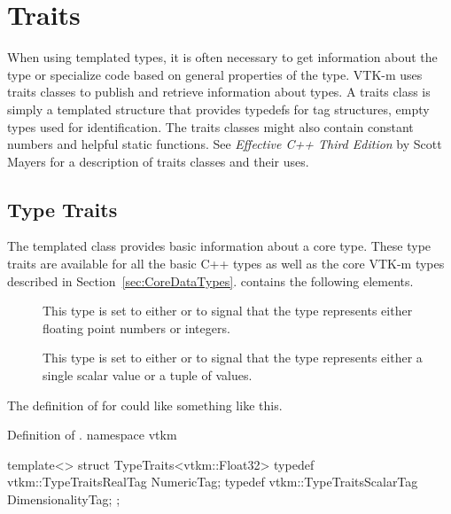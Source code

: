 \section{Traits}
\label{sec:Traits}


When using templated types, it is often necessary to get information about
the type or specialize code based on general properties of the type. VTK-m
uses traits classes to publish and retrieve information about types. A
traits class is simply a templated structure that provides typedefs for
tag structures, empty types used for identification. The traits
classes might also contain constant numbers and helpful static
functions. See {\it Effective C++ Third Edition} by Scott Mayers for a
description of traits classes and their uses.

\subsection{Type Traits}

The  templated class provides basic information
about a core type. These type traits are available for all the basic C++
types as well as the core VTK-m types described in
Section~\ref{sec:CoreDataTypes}.  contains the following
elements.


\begin{description}
\item[]  
  This type is set to either  or
   to signal that the type represents either
  floating point numbers or integers.
\item[] 
   This type is set to either
   or  to signal that
  the type represents either a single scalar value or a tuple of values.
\end{description}

The definition of  for  could like something
like this.
\begin{vtkmexample}{Definition of \protect {}.}
namespace vtkm {

template<>
struct TypeTraits<vtkm::Float32>
{
  typedef vtkm::TypeTraitsRealTag NumericTag;
  typedef vtkm::TypeTraitsScalarTag DimensionalityTag;
};

}
\end{vtkmexample}

